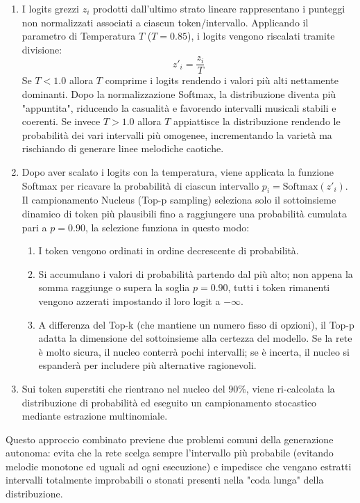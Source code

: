 \begin{enumerate}
    \item I logits grezzi $z_i$ prodotti dall'ultimo strato lineare rappresentano i punteggi non normalizzati associati a ciascun token/intervallo. Applicando il parametro di Temperatura $T$ ($T = 0.85$), i logits vengono riscalati tramite divisione:  $$z'_i = \frac{z_i}{T}$$
Se $T<1.0$ allora $T$ comprime i logits rendendo i valori più alti nettamente dominanti. Dopo la normalizzazione Softmax, la distribuzione diventa più "appuntita", riducendo la casualità e favorendo intervalli musicali stabili e coerenti. 
Se invece $T>1.0$ allora $T$ appiattisce la distribuzione rendendo le probabilità dei vari intervalli più omogenee, incrementando la varietà ma rischiando di generare linee melodiche caotiche.

    \item Dopo aver scalato i logits con la temperatura, viene applicata la funzione Softmax per ricavare la probabilità di ciascun intervallo $p_i = \text{Softmax}(z'_i)$. Il campionamento Nucleus (Top-p sampling) seleziona solo il sottoinsieme dinamico di token più plausibili fino a raggiungere una probabilità cumulata pari a $p = 0.90$, la selezione funziona in questo modo:
     \begin{enumerate}
        \item I token vengono ordinati in ordine decrescente di probabilità.
        \item Si accumulano i valori di probabilità partendo dal più alto; non appena la somma raggiunge o supera la soglia $p = 0.90$, tutti i token rimanenti vengono azzerati impostando il loro logit a $-\infty$.
        \item A differenza del Top-k (che mantiene un numero fisso di opzioni), il Top-p adatta la dimensione del sottoinsieme alla certezza del modello. Se la rete è molto sicura, il nucleo conterrà pochi intervalli; se è incerta, il nucleo si espanderà per includere più alternative ragionevoli.
    \end{enumerate}
    \item Sui token superstiti che rientrano nel nucleo del $90\%$, viene ri-calcolata la distribuzione di probabilità ed eseguito un campionamento stocastico mediante estrazione multinomiale.
\end{enumerate}
Questo approccio combinato previene due problemi comuni della generazione autonoma: evita che la rete scelga sempre l'intervallo più probabile (evitando melodie monotone ed uguali ad ogni esecuzione) e impedisce che vengano estratti intervalli totalmente improbabili o stonati presenti nella "coda lunga" della distribuzione.



